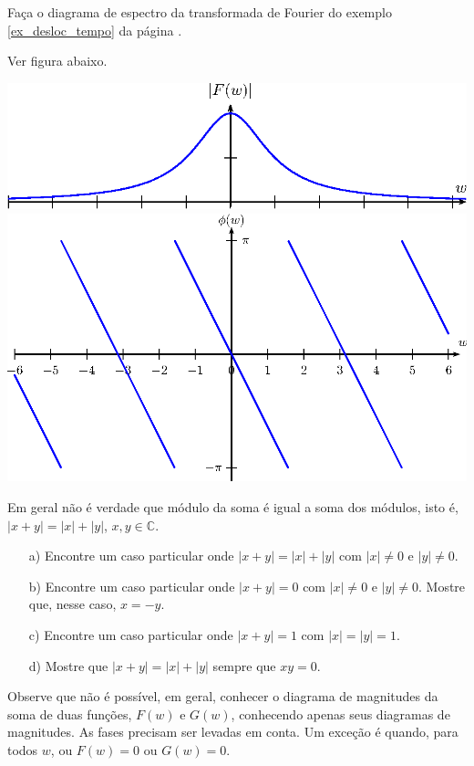 \begin{exer}Faça o diagrama de espectro da transformada de Fourier do exemplo \ref{ex_desloc_tempo} da página \pageref{ex_desloc_tempo}.
\end{exer}
\begin{resp}Ver figura abaixo.
\begin{center}
\includegraphics{cap_propriedades_transformada/pics/figura_11}
\includegraphics{cap_propriedades_transformada/pics/figura_12}\end{center}
\end{resp}
\begin{exer} Em geral não é verdade que módulo da soma é igual a soma dos módulos, isto é, $|x+y|=|x|+|y|$, $x,y\in\mathbb{C}$.
\begin{itemize}
\item[a)] Encontre um caso particular onde $|x+y|=|x|+|y|$ com $|x|\neq 0$ e $|y|\neq 0$.
\item[b)] Encontre um caso particular onde $|x+y|=0$ com $|x|\neq 0$ e $|y|\neq 0$. Mostre que, nesse caso, $x=-y$.
\item[c)] Encontre um caso particular onde $|x+y|=1$ com $|x|=|y|=1$.
\item[d)] Mostre que $|x+y|=|x|+|y|$ sempre que $xy=0$.
\end{itemize}
Observe que não é possível, em geral, conhecer o diagrama de magnitudes da soma de duas funções, $F(w)$ e $G(w)$, conhecendo apenas seus diagramas de magnitudes. As fases precisam ser levadas em conta. Um exceção é quando, para todos $w$, ou $F(w)=0$ ou $G(w)=0$.
\end{exer} 
